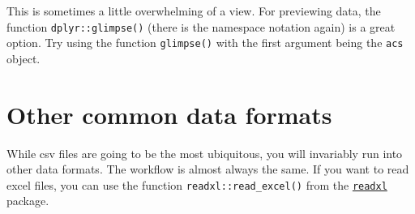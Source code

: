 \documentclass[
]{book}
\newenvironment{Shaded}{\begin{snugshade}}{\end{snugshade}}
\newcommand{\CommentTok}[1]{\textcolor[rgb]{0.56,0.35,0.01}{\textit{#1}}}
\newcommand{\KeywordTok}[1]{\textcolor[rgb]{0.13,0.29,0.53}{\textbf{#1}}}
\newcommand{\NormalTok}[1]{#1}
\begin{document}
This is sometimes a little overwhelming of a view. For previewing data, the function \texttt{dplyr::glimpse()} (there is the namespace notation again) is a great option. Try using the function \texttt{glimpse()} with the first argument being the \texttt{acs} object.

\begin{Shaded}
\end{Shaded}

\hypertarget{other-common-data-formats}{%
\section{Other common data formats}\label{other-common-data-formats}}

While csv files are going to be the most ubiquitous, you will invariably run into other data formats. The workflow is almost always the same. If you want to read excel files, you can use the function \texttt{readxl::read\_excel()} from the \href{https://readxl.tidyverse.org/}{\texttt{readxl}} package.
\end{document}
